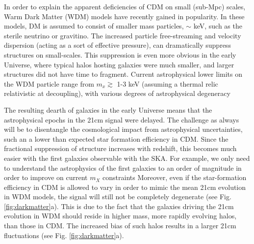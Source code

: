 \documentclass{PoS}
\begin{document}
In order to explain the apparent deficiencies of CDM on small (sub-Mpc) scales, Warm Dark Matter (WDM) models have recently gained in popularity.  In these models, DM is assumed to consist of smaller mass particles, $\sim$ keV, such as the sterile neutrino or gravitino.  The increased particle free-streaming and velocity dispersion (acting as a sort of effective pressure), can dramatically suppress structures on small-scales.  This suppression is even more obvious in the early Universe, where typical halos hosting galaxies were much smaller, and larger structures did not have time to fragment.  Current astrophysical lower limits on the WDM particle range from $m_x \gtrsim$ 1-3 keV (assuming a thermal relic relativistic at decoupling), with various degrees of astrophysical degeneracy \cite[e.g.][]{2013MNRAS.432.3218D,2013ApJ...767...22K,2014MNRAS.443..678P,2013PhRvD..88d3502V}

The resulting dearth of galaxies in the early Universe means that the astrophysical epochs in the 21cm signal were delayed.  The challenge as always will be to disentangle the cosmological impact from astrophysical uncertainties, such an a lower than expected star formation efficiency in CDM.  Since the fractional suppression of structure increases with redshift, this becomes much easier with the first galaxies observable with the SKA.  For example, we only need to understand the astrophysics of the first galaxies to an order of magnitude in order to improve on current $m_X$ constraints \citep{2014MNRAS.438.2664S}
Moreover, even if the star-formation efficiency in CDM is allowed to vary in order to mimic the mean 21cm evolution in WDM models, the signal will still not be completely degenerate (see Fig. \ref{fig:darkmatter}a).  This is due to the fact that the galaxies driving the 21cm evolution in WDM should reside in higher mass, more rapidly evolving halos, than those in CDM.  The increased bias of such halos results in a larger 21cm fluctuations (see Fig. \ref{fig:darkmatter}a).
\end{document}
